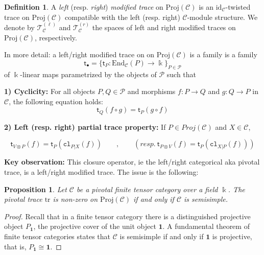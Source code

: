 \documentclass[11pt]{article}
\newcommand{\C}{\mathcal{C}}
\newtheorem{proposition}[theorem]{Proposition}
\theoremstyle{definition}
\newtheorem{definition}[theorem]{Definition}
\begin{document}
\begin{definition}
A \emph{left} (resp. \emph{right}) \emph{modified trace} on $\mathrm{Proj}(\mathcal{C})$ is an $\mathrm{id}_{\mathcal{C}}$-twisted trace
on $\mathrm{Proj}(\mathcal{C})$ compatible with the left (resp. right) $\mathcal{C}$-module structure. We denote by
$\mathcal{T}_{\mathcal{C}}^{(\ell)}$ and $\mathcal{T}_{\mathcal{C}}^{(r)}$ the spaces of left and right modified traces on $\mathrm{Proj}(\mathcal{C})$, respectively.


In more detail: a left/right modified trace  on on $\mathrm{Proj}(\mathcal{C})$ is  a family
is a family
\[
\mathsf{t}_\bullet = \{ \mathsf{t}_P : \mathrm{End}_{\mathcal{C}}(P) \to \Bbbk \}_{P \in \mathcal{P}}
\]
of $\Bbbk$-linear maps parametrized by the objects of $\mathcal{P}$ such that

\medskip
\noindent\textbf{1) Cyclicity:} For all objects $P, Q \in \mathcal{P}$ and morphisms $f : P \to Q$ and $g : Q \to
P$ in $\mathcal{C}$, the following equation holds: $$\mathsf{t}_Q(f \circ g)  =  \mathsf{t}_P(g \circ f)  $$


\medskip
\noindent\textbf{2)  Left (resp. right) partial trace property:}  If $P\in Proj (\C)$ and $X \in \C$, 

$$ \mathsf{t}_{V \otimes P}(f) = \mathsf{t}_P (\mathtt{cl}_{P|X}(f))  \qquad , \qquad (resp. \ \mathsf{t}_{P \otimes V}(f) = \mathsf{t}_P (\mathtt{cl}_{X|P}(f)) )  $$





\textbf{Key observation:} This closure operator, ie the  left/right categorical aka pivotal trace, is a left/right modified trace. The issue is the following:

\begin{proposition}
Let $\mathcal{C}$ be a pivotal finite tensor category over a field $\Bbbk$. The pivotal trace
$\mathrm{tr} $ is non-zero on
$ \mathrm{Proj}(\mathcal{C})$ if and only if $\mathcal{C}$ is semisimple.
\end{proposition}

\begin{proof}
Recall that in a finite tensor category there is a distinguished projective object
$P_{\mathbf{1}}$, the projective cover of the unit object $\mathbf{1}$. A fundamental theorem of
finite tensor categories states that $\mathcal{C}$ is semisimple if and only if $\mathbf{1}$ is
projective, that is, $P_{\mathbf{1}} \cong \mathbf{1}$.


\end{proof}
\end{definition}
\end{document}

